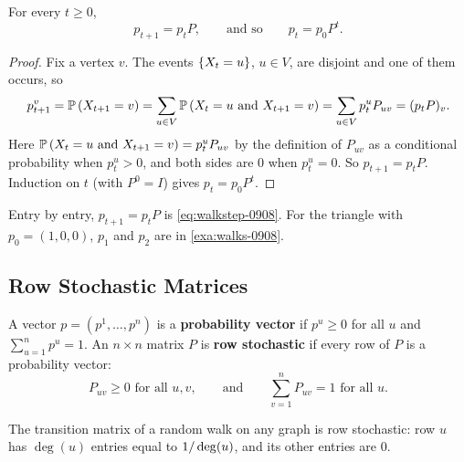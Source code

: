 \begin{lemma}\label{lem:evolution-0910}
    For every $t \geq 0$,
    \[p_{t+1} = p_t P, \qquad \text{and so} \qquad p_t = p_0 P^t.\]
\end{lemma}

\begin{proof}
    Fix a vertex $v$. The events $\left\lbrace X_t = u\right\rbrace$, $u \in V$, are disjoint and one of them occurs, so
    \[p_{t+1}^v = \operatorname{\mathbb{P}}\left(X_{t+1} = v\right) = \sum_{u \in V} \operatorname{\mathbb{P}}\left(X_t = u \text{ and } X_{t+1} = v\right)
        = \sum_{u \in V} p_t^u P_{uv} = (p_t P)_v.\]
    Here $\operatorname{\mathbb{P}}\left(X_t = u \text{ and } X_{t+1} = v\right) = p_t^u P_{uv}$ by the definition of $P_{uv}$ as a
    conditional probability when $p_t^u > 0$, and both sides are $0$ when $p_t^u = 0$. So
    $p_{t+1} = p_t P$. Induction on $t$ (with $P^0 = I$) gives $p_t = p_0 P^t$.
\end{proof}

Entry by entry, $p_{t+1} = p_t P$ is \cref{eq:walkstep-0908}. For the triangle with $p_0 = (1,0,0)$,
$p_1$ and $p_2$ are in \cref{exa:walks-0908}.

\subsection{Row Stochastic Matrices}

\begin{definition}\label{def:stochastic-0910}
    A vector $p = (p^1, \dots, p^n)$ is a \textbf{probability vector} if $p^u \geq 0$ for all $u$ and
    $\sum_{u=1}^{n} p^u = 1$. An $n \times n$ matrix $P$ is \textbf{row stochastic} if every row of $P$ is a
    probability vector:
    \[P_{uv} \geq 0 \text{ for all } u, v, \qquad \text{and} \qquad \sum_{v=1}^{n} P_{uv} = 1 \text{ for all } u.\]
\end{definition}

The transition matrix of a random walk on any graph is row stochastic: row $u$ has $\deg(u)$ entries
equal to $1/\deg(u)$, and its other entries are $0$.

